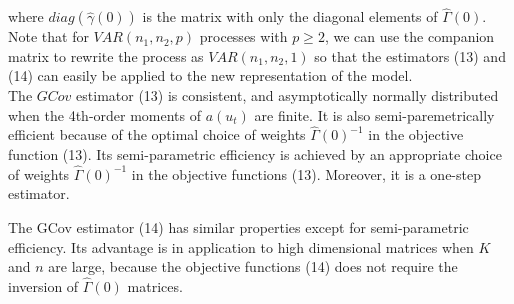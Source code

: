 \documentclass[<1p>]{elsarticle} %
\begin{document}
where $diag(\hat{\gamma}(0))$ is the matrix with only the diagonal elements of $\hat{\Gamma}(0)$.\\
\indent Note that for $VAR(n_1, n_2, p)$ processes with $p \geq 2$, we can use the companion matrix to rewrite the process as $VAR(n_1, n_2, 1)$ so that the estimators (13) and (14) can easily be applied to the new representation of the model.\\
\indent The $GCov$ estimator (13) is consistent, and asymptotically normally distributed when the 4th-order moments of $a(u_t)$ are finite. 
It is also semi-paremetrically efficient because of the optimal choice of weights $\widehat{\Gamma}(0)^{-1}$ in the objective function (13). Its semi-parametric efficiency is achieved by an appropriate choice of weights $\widehat{\Gamma}(0)^{-1}$ in the objective functions (13). Moreover, it is a one-step estimator.

The GCov estimator (14) has similar properties except for semi-parametric efficiency. Its advantage is in application to high dimensional matrices when $K$ and $n$ are large, because the objective functions (14) does not require the inversion of $\hat{\Gamma}(0)$ matrices.
\end{document}
